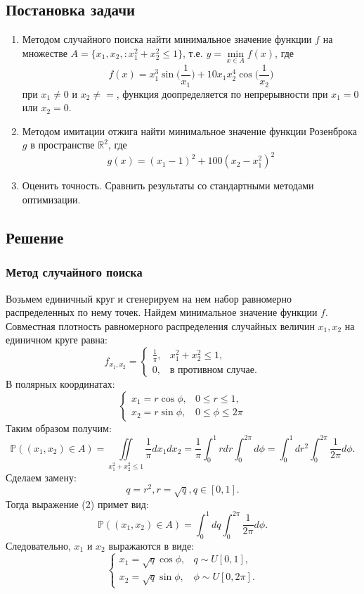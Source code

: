 \documentclass[11pt]{article}
\begin{document}
\subsection{Постановка задачи}
\begin{enumerate}
	\item Методом случайного поиска найти минимальное значение функции $f$ на множестве $A = \{x_1,x_2,:x_1^2 + x_2^2 \leq 1 \}$, т.е. $y = \underset{x \in A}{\min}f(x)$, где
	\[ f(x) = x_1^3\sin\bigg(\frac{1}{x_1}\bigg) + 10x_1x_2^4\cos\bigg(\frac{1}{x_2} \bigg) \]
	при $x_1 \neq 0$ и $x_2 \neq =$, функция доопределяется по непрерывности при $x_1 = 0$ или $x_2 = 0$. 
	\item Методом имитации отжига найти минимальное значение функции Розенброка $g$ в пространстве $\mathbb{R}^2$, где 
	\[ g(x) = (x_1 - 1)^2 + 100(x_2 - x_1^2)^2\]
	\item Оценить точность. Сравнить результаты со стандартными методами оптимизации.
\end{enumerate}

\subsection{Решение}
\subsubsection{Метод случайного поиска}
Возьмем единичный круг и сгенерируем на нем набор равномерно распределенных по нему точек. Найдем минимальное значение функции $f$.\\
Совместная плотность равномерного распределения случайных величин $x_1,x_2$ на единичном круге равна:
\[ f_{x_1,x_2} = \begin{cases}
 \frac{1}{\pi}, & x_1^2 + x_2^2 \leq 1,\\
 0, & \text{в противном случае.}
\end{cases} \]
В полярных координатах:
\[  \begin{cases}
x_1 = r\cos\phi, & 0 \leq r \leq 1,\\
x_2 = r\sin\phi, & 0 \leq \phi \leq 2\pi
\end{cases} \]
Таким образом получим:
\begin{equation}
\mathbb{P}((x_1,x_2)\in A) = \underset{x_1^2 + x_2^2 \leq 1}{\iint}\frac{1}{\pi}dx_1dx_2 = \frac{1}{\pi} \int_{0}^{1}rdr\int_{0}^{2\pi}d\phi = \int_{0}^{1}dr^2 \int_{0}^{2\pi}\frac{1}{2\pi}d\phi.
\end{equation}
Сделаем замену:
\[ q = r^2, r = \sqrt{q}, q\in [0,1]. \]
Тогда выражение (2) примет вид:
\[\mathbb{P}((x_1,x_2) \in A) = \int_{0}^{1}dq\int_{0}^{2\pi}\frac{1}{2\pi}d\phi. \]
Следовательно, $x_1$ и $x_2$ выражаются в виде:
\[ \begin{cases}
x_1 = \sqrt{q}\cos\phi, & q \sim U[0,1],\\
x_2 = \sqrt{q}\sin\phi, & \phi \sim U[0,2\pi].
\end{cases} \]
\end{document}
